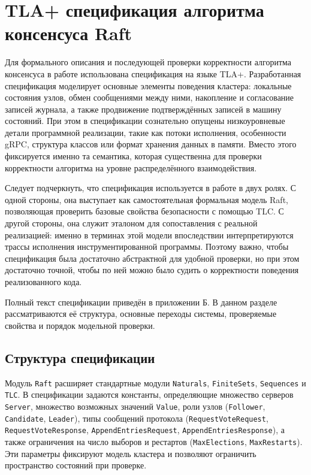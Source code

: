 \section{TLA+ спецификация алгоритма консенсуса Raft}

Для формального описания и последующей проверки корректности алгоритма
консенсуса в работе использована спецификация на языке TLA+. Разработанная
спецификация моделирует основные элементы поведения кластера: локальные
состояния узлов, обмен сообщениями между ними, накопление и согласование
записей журнала, а также продвижение подтверждённых записей в машину состояний.
При этом в спецификации сознательно опущены низкоуровневые детали программной
реализации, такие как потоки исполнения, особенности gRPC, структура классов
или формат хранения данных в памяти. Вместо этого фиксируется именно та
семантика, которая существенна для проверки корректности алгоритма на уровне
распределённого взаимодействия.

Следует подчеркнуть, что спецификация используется в работе в двух ролях.
С одной стороны, она выступает как самостоятельная формальная модель Raft,
позволяющая проверить базовые свойства безопасности с помощью TLC. С другой
стороны, она служит эталоном для сопоставления с реальной реализацией:
именно в терминах этой модели впоследствии интерпретируются трассы исполнения
инструментированной программы. Поэтому важно, чтобы спецификация была
достаточно абстрактной для удобной проверки, но при этом достаточно точной,
чтобы по ней можно было судить о корректности поведения реализованного кода.

Полный текст спецификации приведён в приложении Б. В данном разделе
рассматриваются её структура, основные переходы системы, проверяемые свойства и
порядок модельной проверки.

\subsection{Структура спецификации}

Модуль \texttt{Raft} расширяет стандартные модули \texttt{Naturals},
\texttt{FiniteSets}, \texttt{Sequences} и \texttt{TLC}. В спецификации задаются
константы, определяющие множество серверов \texttt{Server}, множество возможных
значений \texttt{Value}, роли узлов (\texttt{Follower}, \texttt{Candidate},
\texttt{Leader}), типы сообщений протокола
(\texttt{RequestVoteRequest}, \texttt{RequestVoteResponse},
\texttt{AppendEntriesRequest}, \texttt{AppendEntriesResponse}), а также
ограничения на число выборов и рестартов
(\texttt{MaxElections}, \texttt{MaxRestarts}). Эти параметры фиксируют модель
кластера и позволяют ограничить пространство состояний при проверке.

